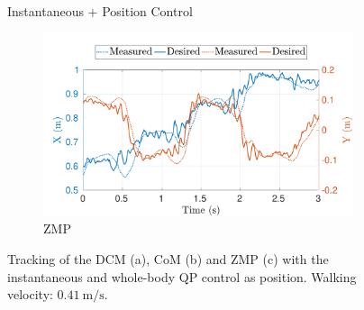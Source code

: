 \begin{figure}[t]
\begin{myframe}{Instantaneous + Position Control}
\begin{subfigure}[b]{0.49\textwidth}
        \includegraphics[width=\textwidth]{chapter_simplified_benchmarking/figures/inst_pos-max_vel-zmp.pdf}
        \caption{ZMP}
        \label{fig:inst_pos-max_vel-zmp}
    \end{subfigure}
    \end{myframe}
    \caption{Tracking of the DCM (a), CoM (b) and ZMP (c) with the instantaneous and whole-body QP control as position.  Walking velocity: $\SI{0.41}{\meter \per \second}$.}
\end{figure}
